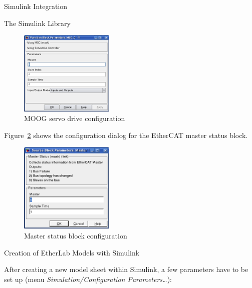 \begin{ighsec}{Simulink Integration}
\begin{ighsec}{The Simulink Library}
\begin{figure}[H]
  \begin{center}
    \includegraphics[width=0.4\textwidth]{images/moog_msd.png}
    \caption{MOOG servo drive configuration}
    \label{fig:msd}
  \end{center}
\end{figure}

Figure~\ref{fig:masterstats} shows the configuration dialog for the EtherCAT
master status block.

\begin{figure}[H]
  \begin{center}
    \includegraphics[width=0.4\textwidth]{images/master.png}
    \caption{Master status block configuration}
    \label{fig:masterstats}
  \end{center}
\end{figure}

\end{ighsec}


\begin{ighsec}{Creation of EtherLab Models with Simulink}
\label{sec:modelle}

After creating a new model sheet within Simulink, a few parameters have to be
set up (menu \textit{Simulation/Configuration Parameters\ldots}):


\end{ighsec}
\end{ighsec}

